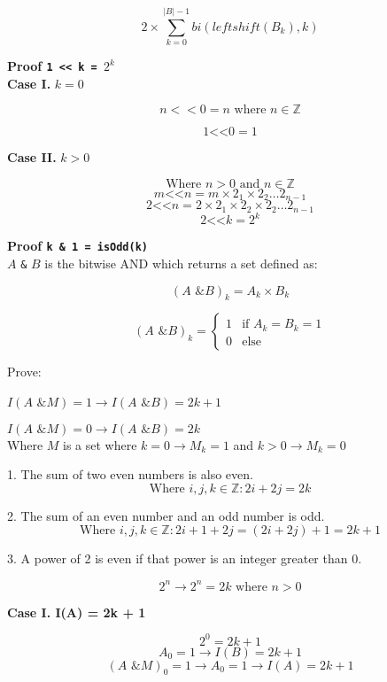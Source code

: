 \documentclass{article}
\begin{document}
$$2 \times \sum_{k=0}^{|B| - 1} bi(leftshift(B_{k}), k)$$

\newpage
\textbf{Proof \texttt{1 << k = $2^{k}$}}\\

\textbf{Case I.} $k = 0$\

$$n << 0 = n \text{ where } n \in \mathbb{Z}$$

$$1 \texttt{<<} 0 = 1$$

\textbf{Case II.} $k > 0$

$$\text{Where } n > 0 \text{ and } n \in \mathbb{Z}$$
$$m \texttt{<<} n = m \times 2_{1} \times 2_{2} \ldots 2_{n - 1}$$
$$2 \texttt{<<} n = 2 \times 2_{1} \times 2_{2} \times 2_{2} \ldots 2_{n - 1}$$
$$2 \texttt{<<} k = 2^{k}$$

\newpage
\textbf{Proof \texttt{k \& 1 =  isOdd(k)}}\\

$A$ \texttt{\&} $B$ is the bitwise AND which returns a set defined as:

$$(A \texttt{ \& } B)_{k} = A_{k} \times B_{k}$$

$$(A \texttt{ \& } B)_{k} = \begin{cases}
1 & \mbox{if } A_{k} = B_{k} = 1\\
0 & \mbox{else}
\end{cases}
$$

Prove:\

$I(A \texttt{ \& } M) = 1 \rightarrow I(A \texttt{ \& } B) = 2k + 1$\

$I(A \texttt{ \& } M) = 0 \rightarrow I(A \texttt{ \& } B) = 2k$\\

Where $M$ is a set where $k = 0 \rightarrow M_{k} = 1$ and $k > 0 \rightarrow M_{k} = 0$

1. The sum of two even numbers is also even. \
$$\text{Where } i,j,k \in \mathbb{Z}: 2i + 2j = 2k $$

2. The sum of an even number and an odd number is odd.
$$\text{Where } i,j,k \in \mathbb{Z}: 2i + 1 + 2j = (2i + 2j) + 1 = 2k + 1$$

3. A power of 2 is even if that power is an integer greater than 0.

$$2^{n} \rightarrow 2^n = 2k \text{ where } n > 0$$

\textbf{Case I. I(A) = 2k + 1}

$$2^{0} = 2k+1$$
$$A_{0} = 1 \rightarrow I(B) = 2k+1$$
$$(A \texttt{ \& } M)_{0} = 1 \rightarrow A_{0} = 1 \rightarrow I(A) = 2k+1$$
\end{document}
